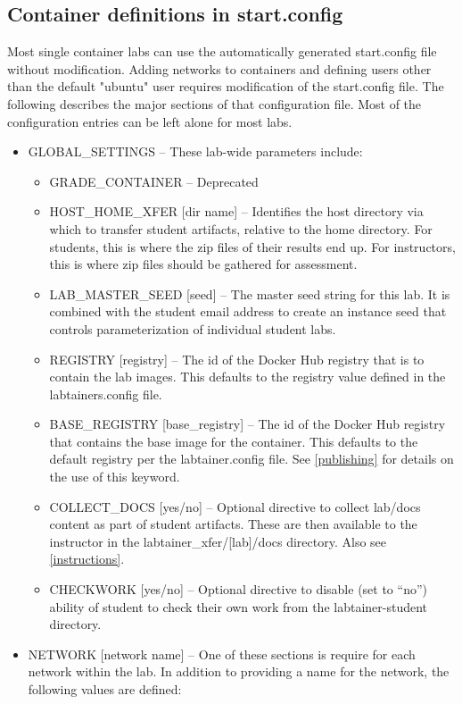\documentclass[12pt]{article}
\begin{document}
\subsection{Container definitions in start.config}
\label{start config}
Most single container labs can use the automatically generated start.config file
without modification.  Adding networks to containers and defining users other than the
default "ubuntu" user requires modification of the start.config file.
The following describes the major sections of that configuration file.  Most of the configuration
entries can be left alone for most labs.
\begin{itemize}
\item GLOBAL\_SETTINGS -- These lab-wide parameters include:

\begin{itemize}
\item GRADE\_CONTAINER -- Deprecated
\item HOST\_HOME\_XFER [dir name] --  Identifies the host directory via which to transfer student artifacts, relative to 
the home directory.  For students, this is where the zip files of their results end up.  For instructors, this is
where zip files should be gathered for assessment.
\item LAB\_MASTER\_SEED [seed] -- The master seed string for this lab.  It is combined with the student email
address to create an instance seed that controls parameterization of individual student labs.
\item REGISTRY [registry] -- The id of the Docker Hub registry that is to contain the lab images. This defaults to the
registry value defined in the labtainers.config file.
\item BASE\_REGISTRY [base\_registry] -- The id of the Docker Hub registry that contains the base image for the container.  This defaults
to the default registry per the labtainer.config file.
See \ref{publishing} for details on the use of this keyword.
\item COLLECT\_DOCS [yes/no] -- Optional directive to collect lab/docs content as part of student artifacts.
These are then available to the instructor in the labtainer\_xfer/[lab]/docs directory.  Also see \ref{instructions}.
\item CHECKWORK [yes/no] -- Optional directive to disable (set to ``no'') ability of student to check their own work from the labtainer-student directory.
\end{itemize}

\item NETWORK [network name] -- One of these sections is require for each network within the lab.  In addition to
providing a name for the network, the following values are defined:


\end{itemize}
\end{document}
